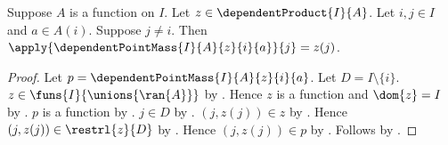 \begin{proposition}\label{spike_dependent_point_mass_other}
    Suppose $A$ is a function on $I$.
    Let $z\in\dependentProduct{I}{A}$.
    Let $i,j\in I$ and $a\in A(i)$.
    Suppose $j\neq i$.
    Then $\apply{\dependentPointMass{I}{A}{z}{i}{a}}{j}=z(j)$.
\end{proposition}
\begin{proof}
    Let $p=\dependentPointMass{I}{A}{z}{i}{a}$.
    Let $D=I\setminus\{i\}$.
    $z\in\funs{I}{\unions{\ran{A}}}$ by
        .
    Hence $z$ is a function and $\dom{z}=I$ by
        .
    $p$ is a function by
        .
    $j\in D$ by .
    $(j,z(j))\in z$ by .
    Hence $(j,z(j))\in\restrl{z}{D}$ by .
    Hence $(j,z(j))\in p$ by
        .
    Follows by .
\end{proof}

